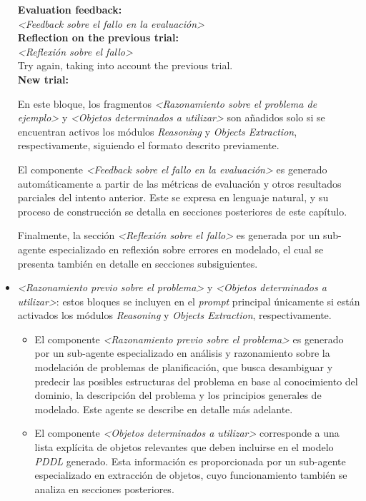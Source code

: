 \begin{anexes}
\begin{itemize}
\begin{tcolorbox}[colback=gray!10!white, colframe=black, title=Bloque de reflexión sobre intento anterior, fonttitle=\bfseries, breakable]
    \textbf{Evaluation feedback:} \\
    \textit{<Feedback sobre el fallo en la evaluación>} \\

    \textbf{Reflection on the previous trial:} \\
    \textit{<Reflexión sobre el fallo>} \\

    Try again, taking into account the previous trial.\\

    \textbf{New trial:}
    \end{tcolorbox}

    En este bloque, los fragmentos \textit{<Razonamiento sobre el problema de ejemplo>} y \textit{<Objetos determinados a utilizar>} son añadidos solo si se encuentran activos los módulos \textit{Reasoning} y \textit{Objects Extraction}, respectivamente, siguiendo el formato descrito previamente.

    El componente \textit{<Feedback sobre el fallo en la evaluación>} es generado automáticamente a partir de las métricas de evaluación y otros resultados parciales del intento anterior. Este se expresa en lenguaje natural, y su proceso de construcción se detalla en secciones posteriores de este capítulo.

    Finalmente, la sección \textit{<Reflexión sobre el fallo>} es generada por un sub-agente especializado en reflexión sobre errores en modelado, el cual se presenta también en detalle en secciones subsiguientes.

    \item \textit{<Razonamiento previo sobre el problema>} y \textit{<Objetos determinados a utilizar>}: estos bloques se incluyen en el \textit{prompt} principal únicamente si están activados los módulos \textit{Reasoning} y \textit{Objects Extraction}, respectivamente.

    \begin{itemize}
        \item El componente \textit{<Razonamiento previo sobre el problema>} es generado por un sub-agente especializado en análisis y razonamiento sobre la modelación de problemas de planificación, que busca desambiguar y predecir las posibles estructuras del problema en base al conocimiento del dominio, la descripción del problema y los principios generales de modelado. Este agente se describe en detalle más adelante.

        \item El componente \textit{<Objetos determinados a utilizar>} corresponde a una lista explícita de objetos relevantes que deben incluirse en el modelo \textit{PDDL} generado. Esta información es proporcionada por un sub-agente especializado en extracción de objetos, cuyo funcionamiento también se analiza en secciones posteriores.
    \end{itemize}


\end{itemize}
\end{anexes}
